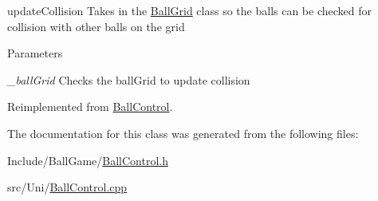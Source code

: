 updateCollision Takes in the \hyperlink{classBallGrid}{BallGrid} class so the balls can be checked for collision with other balls on the grid 
\begin{DoxyParams}{Parameters}
\item[{\em \_\-ballGrid}]Checks the ballGrid to update collision \end{DoxyParams}


Reimplemented from \hyperlink{classBallControl_a352ac9ed1ddedb11892e92ea75e1d171}{BallControl}.

The documentation for this class was generated from the following files:\begin{DoxyCompactItemize}
\item 
Include/BallGame/\hyperlink{BallControl_8h}{BallControl.h}\item 
src/Uni/\hyperlink{BallControl_8cpp}{BallControl.cpp}\end{DoxyCompactItemize}
